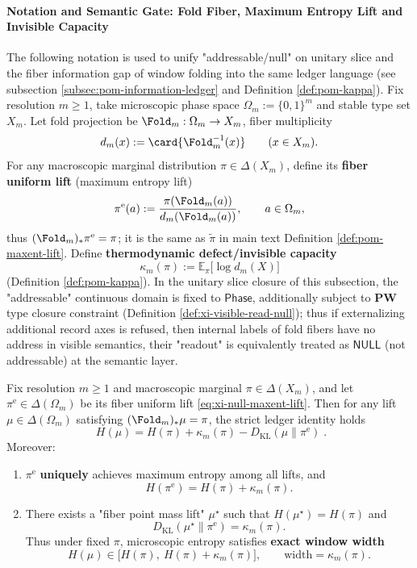 \paragraph{Notation and Semantic Gate: Fold Fiber, Maximum Entropy Lift and Invisible Capacity}\label{par:xi-null-notation-semantic-gate}
The following notation is used to unify "addressable/null" on unitary slice and the fiber information gap of window folding into the same ledger language (see subsection \ref{subsec:pom-information-ledger} and Definition \ref{def:pom-kappa}).
Fix resolution \(m\ge 1\), take microscopic phase space \(\Omega_m:=\{0,1\}^m\) and stable type set \(X_m\).
Let fold projection be \(\Fold_m:\Omega_m\to X_m\), fiber multiplicity
\[
d_m(x):=\card{\Fold_m^{-1}(x)}\qquad(x\in X_m).
\]
For any macroscopic marginal distribution \(\pi\in\Delta(X_m)\), define its \textbf{fiber uniform lift} (maximum entropy lift)
\begin{equation}\label{eq:xi-null-maxent-lift}
\pi^{\mathrm{e}}(a):=\frac{\pi(\Fold_m(a))}{d_m(\Fold_m(a))},\qquad a\in\Omega_m,
\end{equation}
thus \((\Fold_m)_*\pi^{\mathrm{e}}=\pi\); it is the same as \(\widetilde\pi\) in main text Definition \ref{def:pom-maxent-lift}.
Define \textbf{thermodynamic defect/invisible capacity}
\[
\kappa_m(\pi):=\mathbb{E}_{\pi}\bigl[\log d_m(X)\bigr]
\]
(Definition \ref{def:pom-kappa}).
In the unitary slice closure of this subsection, the "addressable" continuous domain is fixed to \(\mathsf{Phase}\), additionally subject to \(\mathbf{PW}\) type closure constraint (Definition \ref{def:xi-visible-read-null}); thus if externalizing additional record axes is refused, then internal labels of fold fibers have no address in visible semantics, their "readout" is equivalently treated as \(\mathsf{NULL}\) (not addressable) at the semantic layer.

\begin{theorem}\label{thm:xi-null-fiber-entropy-window}
Fix resolution \(m\ge 1\) and macroscopic marginal \(\pi\in\Delta(X_m)\), and let \(\pi^{\mathrm{e}}\in\Delta(\Omega_m)\) be its fiber uniform lift \eqref{eq:xi-null-maxent-lift}.
Then for any lift \(\mu\in\Delta(\Omega_m)\) satisfying \((\Fold_m)_*\mu=\pi\), the strict ledger identity holds
\[
\boxed{\;
H(\mu)=H(\pi)+\kappa_m(\pi)-D_{\mathrm{KL}}(\mu\|\pi^{\mathrm{e}})\; }.
\]
Moreover:
\begin{enumerate}
  \item \(\pi^{\mathrm{e}}\) \textbf{uniquely} achieves maximum entropy among all lifts, and
  \[
  H(\pi^{\mathrm{e}})=H(\pi)+\kappa_m(\pi).
  \]
  \item There exists a "fiber point mass lift" \(\mu^\star\) such that \(H(\mu^\star)=H(\pi)\) and
  \[
  D_{\mathrm{KL}}(\mu^\star\|\pi^{\mathrm{e}})=\kappa_m(\pi).
  \]
  Thus under fixed \(\pi\), microscopic entropy satisfies \textbf{exact window width}
  \[
  H(\mu)\in\bigl[H(\pi),\ H(\pi)+\kappa_m(\pi)\bigr],
  \qquad
  \mathrm{width}=\kappa_m(\pi).
  \]
\end{enumerate}
\end{theorem}

